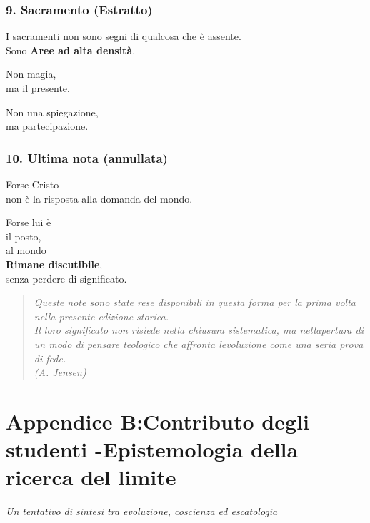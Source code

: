 \documentclass[
]{article}
\begin{document}
\subsubsection{\texorpdfstring{\textbf{9. Sacramento (Estratto)}}{9. Sacramento (Estratto)}}\label{sacramento-estratto}

I sacramenti non sono segni di qualcosa che è assente.\\
Sono \textbf{Aree ad alta densità}.

Non magia,\\
ma il presente.

Non una spiegazione,\\
ma partecipazione.

\subsubsection{\texorpdfstring{\textbf{10. Ultima nota (annullata)}}{10. Ultima nota (annullata)}}\label{ultima-nota-annullata}

Forse Cristo\\
non è la risposta alla domanda del mondo.

Forse lui è\\
il posto,\\
al mondo\\
\textbf{Rimane discutibile},\\
senza perdere di significato.

\begin{quote}
\emph{Queste note sono state rese disponibili in questa forma per la prima volta nella presente edizione storica.\\
Il loro significato non risiede nella chiusura sistematica, ma nell\textquotesingle apertura di un modo di pensare teologico che affronta l\textquotesingle evoluzione come una seria prova di fede.\\
(A. Jensen)}
\end{quote}

\section{\texorpdfstring{Appendice B:\textbf{Contributo degli studenti -Epistemologia della ricerca del limite} }{Appendice B:Contributo degli studenti -Epistemologia della ricerca del limite }}\label{appendice-bcontributo-degli-studenti--epistemologia-della-ricerca-del-limite}

\emph{Un tentativo di sintesi tra evoluzione, coscienza ed escatologia}
\end{document}
